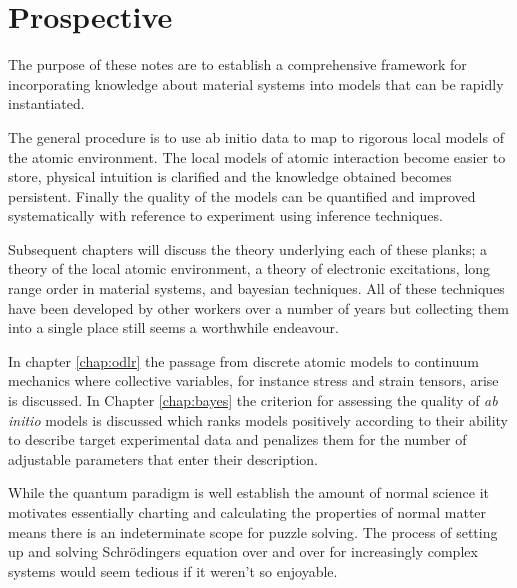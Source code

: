 \section{Prospective}
The purpose of these notes are to establish a comprehensive framework 
for incorporating knowledge about material systems into models that can be rapidly
instantiated.

The general procedure is to use ab initio data to map 
to rigorous local models of the atomic environment. The local models
of atomic interaction become easier to store, physical intuition is clarified
and the knowledge obtained becomes persistent. Finally the quality of the models
can be quantified and improved systematically with reference to experiment using
inference techniques.

Subsequent chapters will discuss the theory underlying each of these planks; a
theory of the local atomic environment, a theory of electronic excitations, long
range order in material systems, and bayesian techniques. All of these techniques
have been developed by other workers over a number of years but collecting 
them into a single place still seems a worthwhile endeavour.

In chapter \ref{chap:odlr} the passage from discrete atomic models to continuum mechanics
where collective variables, for instance stress and strain tensors, arise is discussed. 
In Chapter \ref{chap:bayes} the criterion for assessing the quality of {\it ab initio} 
models is discussed which ranks models positively according to their ability to 
describe target experimental data and penalizes them for the number of 
adjustable parameters that enter their description.

While the quantum paradigm is well establish the amount of normal science it motivates
essentially charting and calculating the properties of normal matter means there is 
an indeterminate scope for puzzle solving. The process of setting up and solving Schr\"odingers
equation over and over for increasingly complex systems would seem tedious if it weren't so enjoyable.

